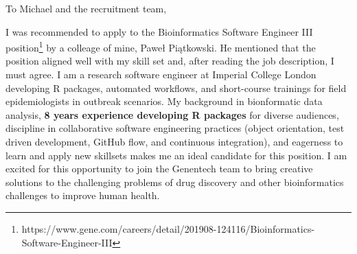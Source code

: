 


\vspace{1ex}
To Michael and the recruitment team,

\vspace{1ex}

I was recommended to apply to the Bioinformatics Software Engineer III
position\footnote{https://www.gene.com/careers/detail/201908-124116/Bioinformatics-Software-Engineer-III}
by a colleage of mine, Paweł Piątkowski. He mentioned that the position aligned
well with my skill set and, after reading the job description, I must agree. I
am a research software engineer at Imperial College London developing R
packages, automated workflows, and short-course trainings for field
epidemiologists in outbreak scenarios. My background in bionformatic data
analysis, \textbf{8 years experience developing R packages} for diverse
audiences, discipline in collaborative software engineering practices (object orientation, test
driven development, GitHub flow, and continuous integration), and eagerness to
learn and apply new skillsets makes me an ideal candidate for this position. I
am excited for this opportunity to join the Genentech team to bring creative 
solutions to the challenging problems of drug discovery and other bioinformatics
challenges to improve human health.

